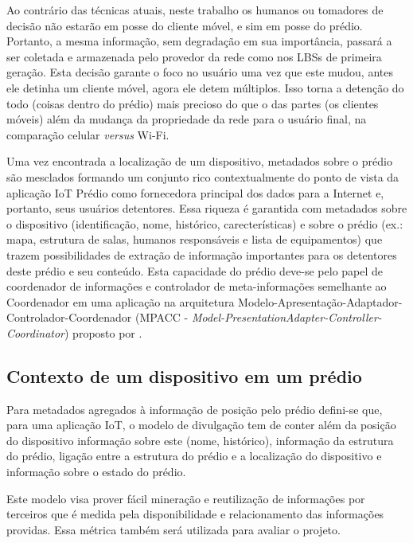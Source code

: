 Ao contrário das técnicas atuais, neste trabalho os humanos ou tomadores de
decisão não estarão em posse do cliente móvel, e sim em posse do prédio.
Portanto, a mesma informação, sem degradação em sua importância, passará a ser
coletada e armazenada pelo provedor da rede como nos LBSs de primeira geração.
Esta decisão garante o foco no usuário uma vez que este mudou, antes ele detinha
um cliente móvel, agora ele detem múltiplos. Isso torna a detenção do todo
(coisas dentro do prédio) mais precioso do que o das partes (os clientes móveis)
além da mudança da propriedade da rede para o usuário final, na comparação
celular \emph{versus} Wi-Fi.

Uma vez encontrada a localização de um dispositivo, metadados sobre o prédio são
mesclados formando um conjunto rico contextualmente do ponto de vista da
aplicação IoT Prédio como fornecedora principal dos dados para a Internet e,
portanto, seus usuários detentores. Essa riqueza é garantida com metadados sobre
o dispositivo (identificação, nome, histórico, carecterísticas) e sobre o prédio
(ex.: mapa, estrutura de salas, humanos responsáveis e lista de equipamentos)
que trazem possibilidades de extração de informação importantes para os
detentores deste prédio e seu conteúdo. Esta capacidade do prédio deve-se pelo
papel de coordenador de informações e controlador de meta-informações semelhante
ao Coordenador em uma aplicação na arquitetura
Modelo-Apresentação-Adaptador-Controlador-Coordenador (MPACC -
\emph{Model-PresentationAdapter-Controller-Coordinator}) proposto por
.


\subsection{Contexto de um dispositivo em um prédio}
\label{subsec:Contexto de um dispositivo em um prédio}

Para metadados agregados à informação de posição pelo prédio defini-se que, para
uma aplicação IoT, o modelo de divulgação tem de conter além da posição do
dispositivo informação sobre este (nome, histórico), informação da estrutura do
prédio, ligação entre a estrutura do prédio e a localização do dispositivo e
informação sobre o estado do prédio.


Este modelo visa prover fácil mineração e reutilização de informações por
terceiros que é medida pela disponibilidade e
relacionamento das informações providas. Essa métrica também será utilizada para
avaliar o projeto.

